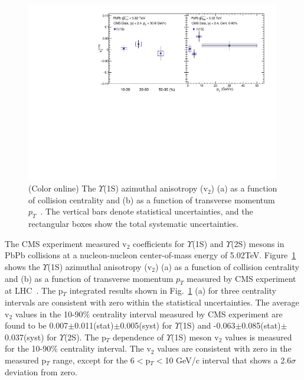 \begin{figure}
\includegraphics[width=0.99\textwidth]{Figures/ExpOverview/Fig_CMS_Y1S_5TeV_V2.pdf}
\caption{(Color online) The $\Upsilon$(1S) azimuthal anisotropy (v$_{2}$) (a) as a
  function of collision centrality and (b) as a function of transverse momentum
  $p_{T}$~\cite{CMS:2020efs}. The vertical bars denote statistical uncertainties,
  and the rectangular boxes show the total systematic uncertainties.
}
\label{fig:Upsilon1SV2CMS}
\end{figure}



The CMS experiment measured v$_{2}$ coefficients for $\Upsilon$(1S) and $\Upsilon$(2S)
mesons in PbPb collisions at a nucleon-nucleon center-of-mass energy of 5.02TeV.
Figure~\ref{fig:Upsilon1SV2CMS} shows the $\Upsilon$(1S) azimuthal
anisotropy (v$_{2}$) (a) as a function of collision centrality and (b) as a
function of transverse momentum $p_{T}$ measured by CMS experiment at
LHC~\cite{CMS:2020efs}. The p$_{T}$ integrated results shown in
Fig.~\ref{fig:Upsilon1SV2CMS} (a) for three centrality intervals are consistent
with zero within the statistical uncertainties. The average v$_{2}$ values in the
10-90$\%$ centrality interval measured by CMS experiment are found to
be 0.007$\pm$0.011(stat)$\pm$0.005(syst) for $\Upsilon$(1S) and
-0.063$\pm$0.085(stat)$\pm$0.037(syst) for $\Upsilon$(2S).   
The p$_{T}$ dependence of $\Upsilon$(1S) meson v$_{2}$ values is measured
for the 10-90$\%$ centrality interval. The v$_{2}$ values are consistent with
zero in the measured p$_T$ range, except for the 6$<$p$_{T}<$10 GeV/c interval that
shows a 2.6$\sigma$ deviation from zero. 

